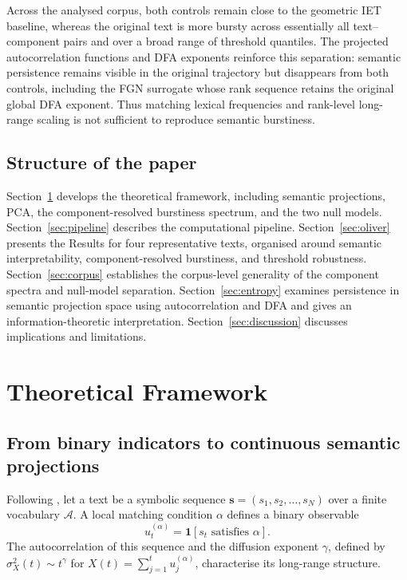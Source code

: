 \documentclass[12pt,a4paper]{article}
\begin{document}
Across the analysed corpus, both controls remain close to the geometric
IET baseline, whereas the original text is more bursty across essentially
all text--component pairs and over a broad range of threshold quantiles.
The projected autocorrelation functions and DFA exponents reinforce this
separation: semantic persistence remains visible in the original
trajectory but disappears from both controls, including the FGN
surrogate whose rank sequence retains the original global DFA exponent.
Thus matching lexical frequencies and rank-level long-range scaling is
not sufficient to reproduce semantic burstiness.

\subsection{Structure of the paper}

Section~\ref{sec:theory} develops the theoretical framework, including
semantic projections, PCA, the component-resolved burstiness spectrum,
and the two null models. Section~\ref{sec:pipeline} describes the
computational pipeline. Section~\ref{sec:oliver} presents the Results
for four representative texts, organised around semantic
interpretability, component-resolved burstiness, and threshold
robustness. Section~\ref{sec:corpus} establishes the corpus-level
generality of the component spectra and null-model separation.
Section~\ref{sec:entropy} examines persistence in semantic projection
space using autocorrelation and DFA and gives an information-theoretic
interpretation. Section~\ref{sec:discussion} discusses implications
and limitations.

\section{Theoretical Framework}
\label{sec:theory}

\subsection{From binary indicators to continuous semantic projections}
\label{sec:observables}

Following \citet{Altmann2012}, let a text be a symbolic sequence
$\mathbf{s}=(s_1,s_2,\ldots,s_N)$ over a finite vocabulary
$\mathcal{A}$.
A local matching condition $\alpha$ defines a binary observable
\begin{equation}
  u_t^{(\alpha)}=\mathbf{1}[s_t\text{ satisfies }\alpha].
  \label{eq:binary_indicator}
\end{equation}
The autocorrelation of this sequence and the diffusion exponent
$\gamma$, defined by $\sigma_X^2(t)\sim t^\gamma$ for
$X(t)=\sum_{j=1}^t u_j^{(\alpha)}$, characterise its long-range
structure.
\end{document}
